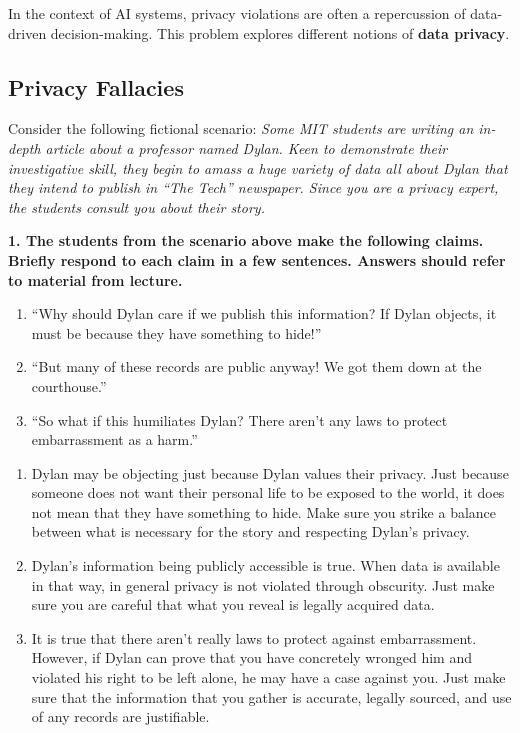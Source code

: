 \documentclass{article}
\begin{document}
In the context of AI systems, privacy violations are often a repercussion of data-driven decision-making. This problem explores different notions of \textbf{data privacy}.

\subsection*{Privacy Fallacies}

Consider the following fictional scenario: \textit{Some MIT students are writing an in-depth article about a professor named Dylan. Keen to demonstrate their investigative skill, they begin to amass a huge variety of data all about Dylan that they intend to publish in ``The Tech'' newspaper. Since you are a privacy expert, the students consult you about their story.}

\textbf{1. The students from the scenario above make the following claims. Briefly respond to each claim in a few sentences. Answers should refer to material from lecture.}
\begin{enumerate}[label=\Alph*.]
    \item ``Why should Dylan care if we publish this information? If Dylan objects, it must be because they have something to hide!''
    \item ``But many of these records are public anyway! We got them down at the courthouse.''
    \item ``So what if this humiliates Dylan? There aren't any laws to protect embarrassment as a harm.''
\end{enumerate}

\bigskip

\begin{mdframed}
\begin{enumerate}[label=\Alph*.]
\item Dylan may be objecting just because Dylan values their privacy. Just because someone does not want their personal life to be exposed to the world, it does not mean that they have something to hide. Make sure you strike a balance between what is necessary for the story and respecting Dylan's privacy.
\item Dylan's information being publicly accessible is true. When data is available in that way, in general privacy is not violated through obscurity. Just make sure you are careful that what you reveal is legally acquired data.
\item It is true that there aren't really laws to protect against embarrassment. However, if Dylan can prove that you have concretely wronged him and violated his right to be left alone, he may have a case against you. Just make sure that the information that you gather is accurate, legally sourced, and use of any records are justifiable.
\end{enumerate}
\end{mdframed}
\bigskip
\end{document}
